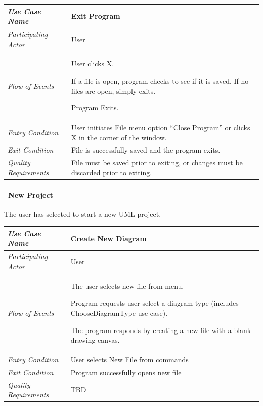 \documentclass[twoside,letterpaper]{article}
\newenvironment{my_enumerate}{
\begin{enumerate}
  \setlength{\itemsep}{1pt}
  \setlength{\parskip}{0pt}
  \setlength{\parsep}{0pt}}{\end{enumerate}
}
\begin{document}
\begin{flushleft}
\tablehead{}
\begin{tabular}{|m{2.0in} m{5.0in}|}
\hline
{\bfseries\emph{Use Case Name}}
& {\bfseries Exit Program}
\\\hline
\emph{Participating Actor}
& User
\\\hline
\emph{Flow of Events}
& \begin{my_enumerate}
\item User clicks X.
\item If a file is open, program checks to see if it is saved.  If no files are open, simply exits.
\item Program Exits.
\end{my_enumerate}
\\\hline
\emph{Entry Condition}
&
User initiates File menu option ``Close Program'' or clicks X in the corner of the window.
\\\hline
\emph{Exit Condition}
& File is successfully saved and the program exits.
\\\hline
\emph{Quality Requirements}
& File must be saved prior to exiting, or changes must be discarded prior to exiting.
\\\hline
\end{tabular}
\end{flushleft}
\bigskip

\clearpage

\paragraph[\ Use Category]
{\ New Project} 
{The user has selected to start a new UML project.}


\begin{flushleft}
\tablehead{}
\begin{tabular}{|m{2.0in} m{5.0in}|}
\hline
{\bfseries\emph{Use Case Name}}
& {\bfseries Create New Diagram }
\\\hline
\emph{Participating Actor}
& User
\\\hline
\emph{Flow of Events}
& \begin{my_enumerate}
\item The user selects new file from menu.
\item Program requests user select a diagram type
(includes ChooseDiagramType use case).
\item The program responds by creating a new file with a blank drawing canvas.
\end{my_enumerate}
\\\hline
\emph{Entry Condition}
& User selects New File from commands
\\\hline
\emph{Exit Condition}
& Program successfully opens new file
\\\hline
\emph{Quality Requirements}
& TBD
\\\hline
\end{tabular}
\end{flushleft}
\bigskip
\end{document}
